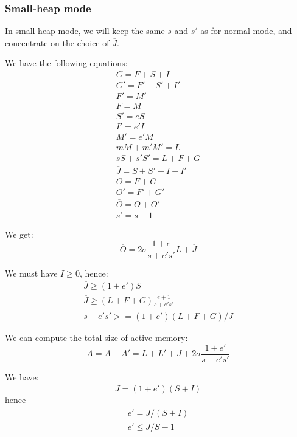 \documentclass{article}
\begin{document}
\subsubsection{Small-heap mode}

In small-heap mode, we will keep the same $s$ and $s'$ as for normal
mode, and concentrate on the choice of $\overline{J}$.

We have the following equations:
\begin{gather*}
G = F + S + I  \\
G' = F' + S' + I'  \\
F' = M'  \\
F = M \\
S' = eS \\
I' = e'I \\
M' = e'M \\
mM + m'M' = L \\
sS + s'S' = L + F + G \\
\overline{J} = S + S' + I + I'  \\
O = F + G  \\
O' = F' + G' \\
\overline{O} = O + O'  \\
s' = s - 1
\end{gather*}

We get:
\begin{equation}
\overline{O} = 2\sigma\frac{1+e}{s+e's'}L + \overline{J}
\end{equation}

We must have $I \geq 0$, hence:
\begin{gather*}
\overline{J} \geq (1+e')S \\
\overline{J} \geq (L+F+G)\frac{e+1}{s + e's'} \\
s + e's' >= (1+e')(L+F+G)/\overline{J}
\end{gather*}

We can compute the total size of active memory:
\begin{equation}
\overline{A} = A + A' = L + L' + \overline{J} + 2\sigma\frac{1+e'}{s + e's'}
\end{equation}

We have:
\begin{equation}
\overline{J} = (1+e')(S+I)
\end{equation}
hence
\begin{gather*}
e' = \overline{J} / (S+I) \\
e' \leq \overline{J}/S - 1
\end{gather*}
\end{document}
